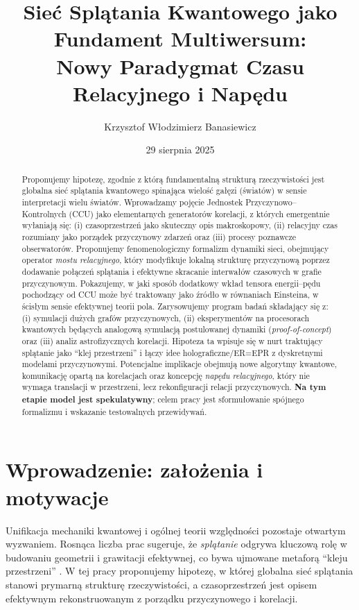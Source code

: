 \documentclass[11pt,a4paper]{article}
\title{\textbf{Sieć Splątania Kwantowego jako Fundament Multiwersum:\\
Nowy Paradygmat Czasu Relacyjnego i Napędu}}
\author[1]{Krzysztof W\l{}odzimierz Banasiewicz}
\affil[1]{\small Independent Researcher, The Hague, Netherlands}
\date{29 sierpnia 2025}
\begin{document}
\maketitle

\begin{abstract}
\noindent
Proponujemy hipotezę, zgodnie z którą fundamentalną strukturą rzeczywistości jest globalna sieć splątania kwantowego spinająca wielość gałęzi (światów) w sensie interpretacji wielu światów. Wprowadzamy pojęcie Jednostek Przyczynowo--Kontrolnych (CCU) jako elementarnych generatorów korelacji, z których emergentnie wyłaniają się: (i) czasoprzestrzeń jako skuteczny opis makroskopowy, (ii) relacyjny czas rozumiany jako porządek przyczynowy zdarzeń oraz (iii) procesy poznawcze obserwatorów. Proponujemy fenomenologiczny formalizm dynamiki sieci, obejmujący operator \emph{mostu relacyjnego}, który modyfikuje lokalną strukturę przyczynową poprzez dodawanie połączeń splątania i efektywne skracanie interwałów czasowych w grafie przyczynowym. Pokazujemy, w jaki sposób dodatkowy wkład tensora energii--pędu pochodzący od CCU może być traktowany jako źródło w równaniach Einsteina, w ścisłym sensie efektywnej teorii pola. Zarysowujemy program badań składający się z: (i) symulacji dużych grafów przyczynowych, (ii) eksperymentów na procesorach kwantowych będących analogową symulacją postulowanej dynamiki (\emph{proof-of-concept}) oraz (iii) analiz astrofizycznych korelacji. Hipoteza ta wpisuje się w nurt traktujący splątanie jako ``klej przestrzeni'' i łączy idee holograficzne/ER=EPR z dyskretnymi modelami przyczynowymi. Potencjalne implikacje obejmują nowe algorytmy kwantowe, komunikację opartą na korelacjach oraz koncepcję \emph{napędu relacyjnego}, który nie wymaga translacji w przestrzeni, lecz rekonfiguracji relacji przyczynowych. \textbf{Na tym etapie model jest spekulatywny}; celem pracy jest sformułowanie spójnego formalizmu i wskazanie testowalnych przewidywań.
\end{abstract}

\section{Wprowadzenie: zało\.zenia i motywacje}
Unifikacja mechaniki kwantowej i ogólnej teorii względności pozostaje otwartym wyzwaniem. Rosnąca liczba prac sugeruje, że \emph{splątanie} odgrywa kluczową rolę w budowaniu geometrii i grawitacji efektywnej, co bywa ujmowane metaforą ``kleju przestrzeni'' \cite{Preskill2018,VanRaamsdonk2010,Swingle2012,MaldacenaSusskind2013}. W tej pracy proponujemy hipotezę, w której globalna sieć splątania stanowi prymarną strukturę rzeczywistości, a czasoprzestrzeń jest opisem efektywnym rekonstruowanym z porządku przyczynowego i korelacji.
\end{document}
